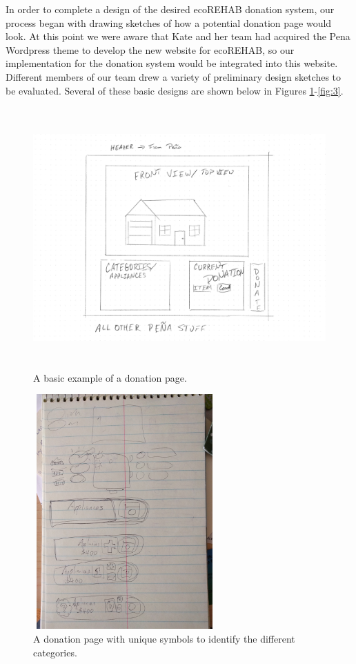 \documentclass[letter]{article}
\begin{document}
In order to complete a design of the desired ecoREHAB donation system, our process began with drawing sketches of how a potential donation page would look. At this point we were aware that Kate and her team had acquired the Pena Wordpress theme to develop the new website for ecoREHAB, so our implementation for the donation system would be integrated into this website. Different members of our team drew a variety of preliminary design sketches to be evaluated. Several of these basic designs are shown below in Figures \ref{fig:1}-\ref{fig:3}.
\begin{figure}[H]
	\includegraphics[width=15cm, height=10cm]{example}
	\captionsetup{justification=centering}
	\caption{A basic example of a donation page.}
	\label{fig:1}
\end{figure}
\begin{figure}[H]
	\includegraphics[width=7cm, height=9cm]{Example4}
	\captionsetup{justification=centering}
	\centering
	\caption{A donation page with unique symbols to identify the different categories.}
	\label{fig:2}
\end{figure}
\end{document}
